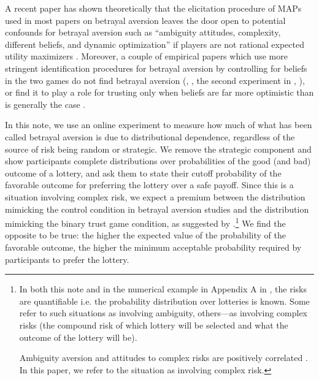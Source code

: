 A recent paper has shown theoretically that the elicitation procedure of MAPs used in most papers on betrayal aversion leaves the door open to potential confounds for betrayal aversion such as ``ambiguity attitudes, complexity, different beliefs, and dynamic optimization'' if players are not rational expected utility maximizers \citep{Li2020a}.
Moreover, a couple of empirical papers which use more stringent identification procedures for betrayal aversion by controlling for beliefs in the two games do not find betrayal aversion (\citeauthor{Fetchenhauer2012}, \citeyear{Fetchenhauer2012}, the second experiment in \citeauthor{Polipciuc2022inout}, \citeyear{Polipciuc2022inout}), or find it to play a role for trusting only when beliefs are far more optimistic than is generally the case \citep{Engelmann2021}.

In this note, we use an online experiment to measure how much of what has been called betrayal aversion is due to distributional dependence, regardless of the source of risk being random or strategic.
We remove the strategic component and show participants complete distributions over probabilities of the good (and bad) outcome of a lottery, and ask them to state their cutoff probability of the favorable outcome for preferring the lottery over a safe payoff.
Since this is a situation involving complex risk, we expect a premium between the distribution mimicking the control condition in betrayal aversion studies and the distribution mimicking the binary trust game condition, as suggested by \cite{Li2020a}.\footnote{
In both this note and in the numerical example in Appendix A in \cite{Li2020a}, the risks are quantifiable i.e. the probability distribution over lotteries is known.
Some refer to such situations as involving ambiguity, others---as involving complex risks (the compound risk of which lottery will be selected and what the outcome of the lottery will be).

Ambiguity aversion and attitudes to complex risks are positively correlated \citep{Armantier2016}.
In this paper, we refer to the situation as involving complex risk.
}
We find the opposite to be true: the higher the expected value of the probability of the favorable outcome, the higher the minimum acceptable probability required by participants to prefer the lottery.

